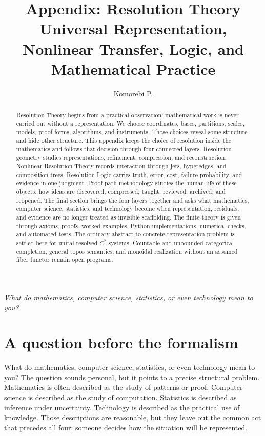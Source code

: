 \documentclass[11pt]{article}
\title{Appendix: Resolution Theory\\
\large Universal Representation, Nonlinear Transfer, Logic, and Mathematical Practice}
\author{Komorebi P.}
\date{}
\theoremstyle{definition}
\theoremstyle{remark}
\begin{document}
\maketitle
\begin{center}
\Large\itshape
What do mathematics, computer science, statistics, or even technology mean to you?
\end{center}

\vspace{0.4em}

\begin{abstract}
Resolution Theory begins from a practical observation: mathematical work is never carried out without a representation.  We choose coordinates, bases, partitions, scales, models, proof forms, algorithms, and instruments.  Those choices reveal some structure and hide other structure.  This appendix keeps the choice of resolution inside the mathematics and follows that decision through four connected layers.  Resolution geometry studies representations, refinement, compression, and reconstruction.  Nonlinear Resolution Theory records interaction through jets, hyperedges, and composition trees.  Resolution Logic carries truth, error, cost, failure probability, and evidence in one judgment.  Proof-path methodology studies the human life of these objects: how ideas are discovered, compressed, taught, reviewed, archived, and reopened.  The final section brings the four layers together and asks what mathematics, computer science, statistics, and technology become when representation, residuals, and evidence are no longer treated as invisible scaffolding.  The finite theory is given through axioms, proofs, worked examples, Python implementations, numerical checks, and automated tests.  The ordinary abstract-to-concrete representation problem is settled here for unital resolved $C^*$-systems.  Countable and unbounded categorical completion, general topos semantics, and monoidal realization without an assumed fiber functor remain open programs.
\end{abstract}
\tableofcontents
\clearpage
\section*{A question before the formalism}

What do mathematics, computer science, statistics, or even technology mean to you?  The question sounds personal, but it points to a precise structural problem.  Mathematics is often described as the study of patterns or proof.  Computer science is described as the study of computation.  Statistics is described as inference under uncertainty.  Technology is described as the practical use of knowledge.  Those descriptions are reasonable, but they leave out the common act that precedes all four: someone decides how the situation will be represented.
\end{document}
